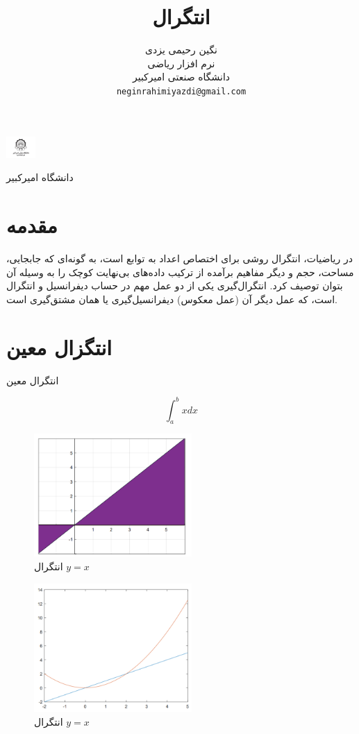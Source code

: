\documentclass{article}
\title{انتگرال}
\author{%
  نگین رحیمی یزدی\\
   نرم افزار ریاضی\\
  دانشگاه صنعتی امیرکبیر\\
  \texttt{neginrahimiyazdi@gmail.com} \\
}
\begin{document}
\begin{minipage}{0.1\textwidth}%
\includegraphics[width=1.1cm]{Amirkabir.jpg}
\end{minipage}%
\hfill%
\begin{minipage}{0.9\textwidth}\raggedleft
دانشگاه امیرکبیر\\
\end{minipage}


\makepertitle


\section{مقدمه} 
در ریاضیات، انتگرال 
روشی برای اختصاص اعداد به توابع است، به گونه‌ای که جابجایی، مساحت، حجم و دیگر مفاهیم برآمده از ترکیب داده‌های بی‌نهایت کوچک را به وسیله آن بتوان توصیف کرد. انتگرال‌گیری یکی از دو عمل مهم در حساب دیفرانسیل و انتگرال است، که عمل دیگر آن (عمل معکوس) دیفرانسیل‌گیری یا همان مشتق‌گیری است.
\cite{Integral,Integralation,MultipleIntegral}

\section{انتگزال معین} 
انتگرال معین
\citep{Adams,Thomas}


$$\int_a^{b}x dx$$
\begin{figure}[!h]
    \centering
    \includegraphics[width=6cm]{code2Integralpic.png}
    \caption{انتگرال $y=x$}
    \label{fig:انتگرال خط}
\end{figure}

\begin{figure}[!h]
    \centering
    \includegraphics[width=6cm]{code1integral.png}
    \caption{انتگرال $y=x$}
    \label{fig:انتگرال خط}
\end{figure}
\end{document}
